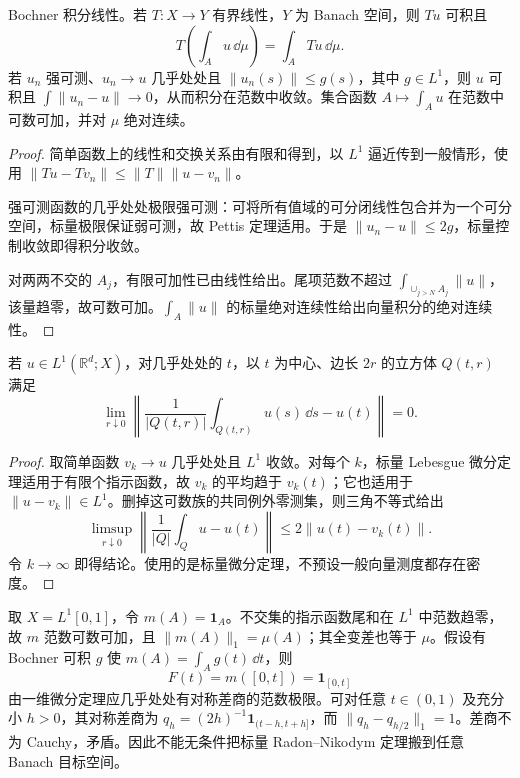 \begin{theorem}[积分运算与控制收敛]\label{thm:y5-bochner-properties}
Bochner 积分线性。若 $T:X\to Y$ 有界线性，$Y$ 为 Banach 空间，则 $Tu$ 可积且
\[
 T\left(\int_Au\,\dd\mu\right)=\int_ATu\,\dd\mu.
\]
若 $u_n$ 强可测、$u_n\to u$ 几乎处处且 $\|u_n(s)\|\le g(s)$，其中 $g\in L^1$，则 $u$ 可积且 $\int\|u_n-u\|\to0$，从而积分在范数中收敛。集合函数 $A\mapsto\int_Au$ 在范数中可数可加，并对 $\mu$ 绝对连续。
\end{theorem}
\begin{proof}
简单函数上的线性和交换关系由有限和得到，以 $L^1$ 逼近传到一般情形，使用 $\|Tu-Tv_n\|\le\|T\|\|u-v_n\|$。

强可测函数的几乎处处极限强可测：可将所有值域的可分闭线性包合并为一个可分空间，标量极限保证弱可测，故 Pettis 定理适用。于是 $\|u_n-u\|\le2g$，标量控制收敛即得积分收敛。

对两两不交的 $A_j$，有限可加性已由线性给出。尾项范数不超过 $\int_{\cup_{j>N}A_j}\|u\|$，该量趋零，故可数可加。$\int_A\|u\|$ 的标量绝对连续性给出向量积分的绝对连续性。
\end{proof}

\begin{theorem}
若 $u\in L^1(\mathbb R^d;X)$，对几乎处处的 $t$，以 $t$ 为中心、边长 $2r$ 的立方体 $Q(t,r)$ 满足
\[
 \lim_{r\downarrow0}\left\|\frac1{|Q(t,r)|}\int_{Q(t,r)}u(s)\,\dd s-u(t)\right\|=0.
\]
\end{theorem}
\begin{proof}
取简单函数 $v_k\to u$ 几乎处处且 $L^1$ 收敛。对每个 $k$，标量 Lebesgue 微分定理适用于有限个指示函数，故 $v_k$ 的平均趋于 $v_k(t)$；它也适用于 $\|u-v_k\|\in L^1$。删掉这可数族的共同例外零测集，则三角不等式给出
\[
 \limsup_{r\downarrow0}\left\|\frac1{|Q|}\int_Qu-u(t)\right\|
 \le 2\|u(t)-v_k(t)\|.
\]
令 $k\to\infty$ 即得结论。使用的是标量微分定理，不预设一般向量测度都存在密度。
\end{proof}

\begin{example}
取 $X=L^1[0,1]$，令 $m(A)=\mathbf1_A$。不交集的指示函数尾和在 $L^1$ 中范数趋零，故 $m$ 范数可数可加，且 $\|m(A)\|_1=\mu(A)$；其全变差也等于 $\mu$。假设有 Bochner 可积 $g$ 使 $m(A)=\int_Ag(t)\,\dd t$，则
\[
 F(t)=m([0,t])=\mathbf1_{[0,t]}
\]
由一维微分定理应几乎处处有对称差商的范数极限。可对任意 $t\in(0,1)$ 及充分小 $h>0$，其对称差商为 $q_h=(2h)^{-1}\mathbf1_{(t-h,t+h]}$，而 $\|q_h-q_{h/2}\|_1=1$。差商不为 Cauchy，矛盾。因此不能无条件把标量 Radon--Nikodym 定理搬到任意 Banach 目标空间。
\end{example}

